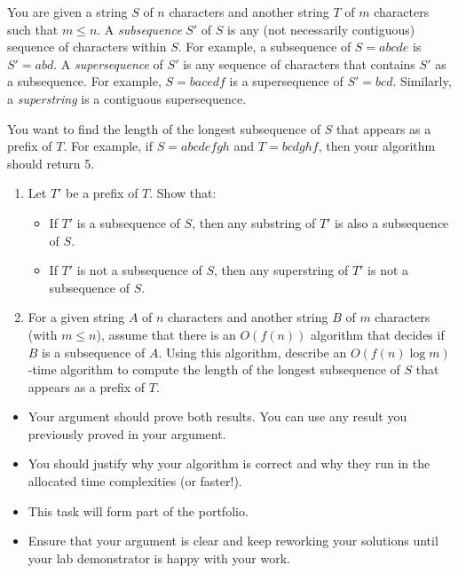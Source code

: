 \documentclass{article}
\begin{document}
\begin{question}
You are given a string $S$ of $n$ characters and another string $T$ of $m$ characters such that $m \leq n$. A {\em subsequence} $S'$ of $S$ is any (not necessarily contiguous) sequence of characters within $S$. For example, a subsequence of $S = abcde$ is $S' = abd$. A {\em supersequence} of $S'$ is any sequence of characters that contains $S'$ as a subsequence. For example, $S = bacedf$ is a supersequence of $S' = bcd$. Similarly, a {\em superstring} is a contiguous supersequence.

You want to find the length of the longest subsequence of $S$ that appears as a prefix of $T$. For example, if $S = abcdefgh$ and $T = bcdghf$, then your algorithm should return 5.

\begin{enumerate}[label = (\alph*)]
    \item Let $T'$ be a prefix of $T$. Show that:
    \begin{itemize}
        \item If $T'$ is a subsequence of $S$, then any substring of $T'$ is also a subsequence of $S$.
        \item If $T'$ is not a subsequence of $S$, then any superstring of $T'$ is not a subsequence of $S$.
    \end{itemize}

    \item For a given string $A$ of $n$ characters and another string $B$ of $m$ characters (with $m \leq n$), assume that there is an $O(f(n))$ algorithm that decides if $B$ is a subsequence of $A$. Using this algorithm, describe an $O(f(n) \log m)$-time algorithm to compute the length of the longest subsequence of $S$ that appears as a prefix of $T$.
\end{enumerate}
\end{question}

\begin{rubric}
\begin{itemize}
    \item Your argument should prove both results. You can use any result you previously proved in your argument.
    
    \item You should justify why your algorithm is correct and why they run in the allocated time complexities (or faster!).

    \item This task will form part of the portfolio.
    \item Ensure that your argument is clear and keep reworking your solutions until your lab demonstrator is happy with your work.
\end{itemize}
\end{rubric}
\end{document}

